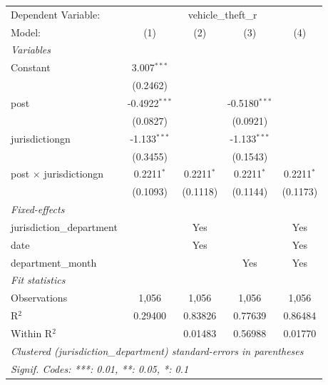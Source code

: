 \begingroup
\centering
\begin{tabular}{lcccc}
   \tabularnewline \midrule \midrule
   Dependent Variable: & \multicolumn{4}{c}{vehicle\_theft\_r}\\
   Model:                        & (1)             & (2)          & (3)             & (4)\\  
   \midrule
   \emph{Variables}\\
   Constant                      & 3.007$^{***}$   &              &                 &   \\   
                                 & (0.2462)        &              &                 &   \\   
   post                          & -0.4922$^{***}$ &              & -0.5180$^{***}$ &   \\   
                                 & (0.0827)        &              & (0.0921)        &   \\   
   jurisdictiongn                & -1.133$^{***}$  &              & -1.133$^{***}$  &   \\   
                                 & (0.3455)        &              & (0.1543)        &   \\   
   post $\times$ jurisdictiongn  & 0.2211$^{*}$    & 0.2211$^{*}$ & 0.2211$^{*}$    & 0.2211$^{*}$\\   
                                 & (0.1093)        & (0.1118)     & (0.1144)        & (0.1173)\\   
   \midrule
   \emph{Fixed-effects}\\
   jurisdiction\_department      &                 & Yes          &                 & Yes\\  
   date                          &                 & Yes          &                 & Yes\\  
   department\_month             &                 &              & Yes             & Yes\\  
   \midrule
   \emph{Fit statistics}\\
   Observations                  & 1,056           & 1,056        & 1,056           & 1,056\\  
   R$^2$                         & 0.29400         & 0.83826      & 0.77639         & 0.86484\\  
   Within R$^2$                  &                 & 0.01483      & 0.56988         & 0.01770\\  
   \midrule \midrule
   \multicolumn{5}{l}{\emph{Clustered (jurisdiction\_department) standard-errors in parentheses}}\\
   \multicolumn{5}{l}{\emph{Signif. Codes: ***: 0.01, **: 0.05, *: 0.1}}\\
\end{tabular}
\par\endgroup
